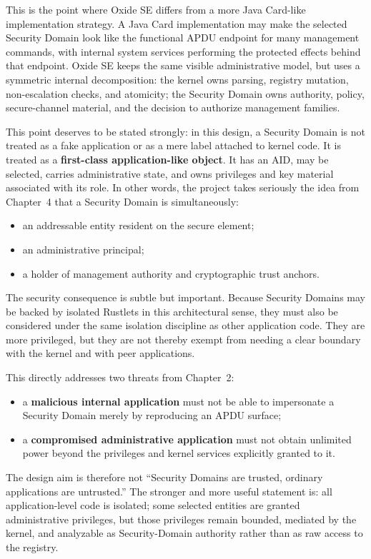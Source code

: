 This is the point where Oxide SE differs from a more Java Card-like
implementation strategy. A Java Card implementation may make the selected
Security Domain look like the functional APDU endpoint for many management
commands, with internal system services performing the protected effects behind
that endpoint. Oxide SE keeps the same visible administrative model, but uses a
symmetric internal decomposition: the kernel owns parsing, registry mutation,
non-escalation checks, and atomicity; the Security Domain owns authority,
policy, secure-channel material, and the decision to authorize management
families.

This point deserves to be stated strongly: in this design, a Security
Domain is not treated as a fake application or as a mere label attached to
kernel code. It is treated as a \textbf{first-class application-like object}.
It has an AID, may be selected, carries administrative state, and owns
privileges and key material associated with its role. In other words, the
project takes seriously the idea from Chapter~4 that a Security Domain is
simultaneously:
\begin{itemize}
\item an addressable entity resident on the secure element;
\item an administrative principal;
\item a holder of management authority and cryptographic trust anchors.
\end{itemize}

The security consequence is subtle but important. Because Security Domains may
be backed by isolated Rustlets in this architectural sense, they must also be
considered under the same isolation discipline as other application code. They
are more privileged, but they are not thereby exempt from needing a clear
boundary with the kernel and with peer applications.

This directly addresses two threats from Chapter~2:
\begin{itemize}
\item a \textbf{malicious internal application} must not be able to
  impersonate a Security Domain merely by reproducing an APDU surface;
\item a \textbf{compromised administrative application} must not obtain
  unlimited power beyond the privileges and kernel services explicitly
  granted to it.
\end{itemize}

The design aim is therefore not ``Security Domains are trusted, ordinary
applications are untrusted.'' The stronger and more useful statement is:
all application-level code is isolated; some selected entities are granted
administrative privileges, but those privileges remain bounded, mediated by the
kernel, and analyzable as Security-Domain authority rather than as raw access to
the registry.


